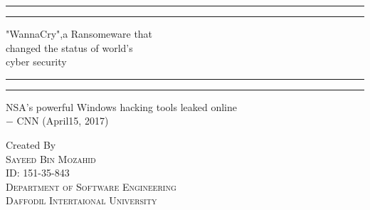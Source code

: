 \documentclass[a4paper,10pt]{article}
\begin{document}
\begin{titlepage}
	\centering %
	
	\scshape %
	
	\vspace*{\baselineskip} %
	
	
	\rule{\textwidth}{1.6pt}\vspace*{-\baselineskip}\vspace*{2pt} %
	\rule{\textwidth}{0.4pt} %
	
	\vspace{0.75\baselineskip} %
	
	{\LARGE "WannaCry",a Ransomeware that\\ changed the status of world's \\ cyber security\\} %
	
	\vspace{0.75\baselineskip} %
	
	\rule{\textwidth}{0.4pt}\vspace*{-\baselineskip}\vspace{3.2pt} %
	\rule{\textwidth}{1.6pt} %
	
	\vspace{2\baselineskip} %
	
	
	NSA's powerful Windows hacking tools leaked online \\ $-$ CNN (April15, 2017) %
	
	\vspace*{3\baselineskip} %
	
	
	
	
	\vspace{9.5\baselineskip} %
	Created By
	\\
	{\scshape\large Sayeed Bin Mozahid \\ ID: 151-35-843 \\ } %
	{\scshape\Medium Department  of  Software Engineering \\}
	{\scshape\Medium Daffodil Intertaional University }
	

\end{titlepage}
\end{document}

